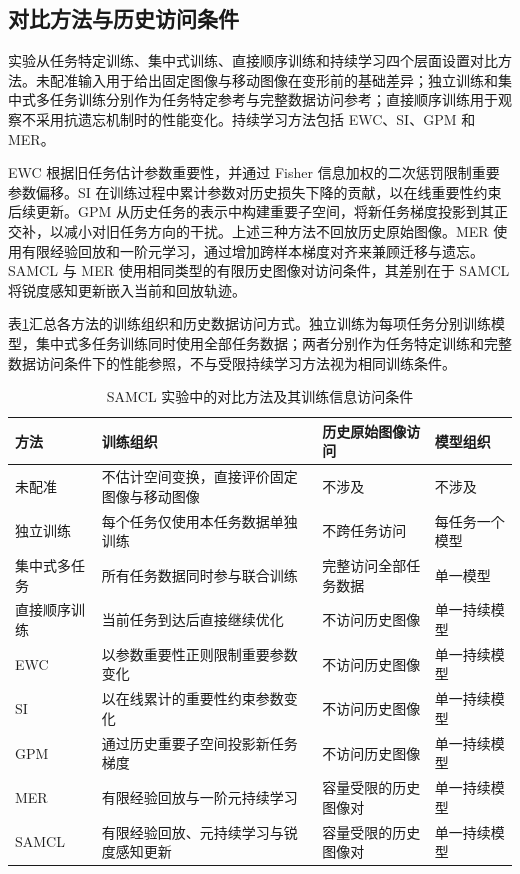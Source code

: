 \subsection{对比方法与历史访问条件}
\label{subsubsec:samcl-baselines}

实验从任务特定训练、集中式训练、直接顺序训练和持续学习四个层面设置对比方法。未配准输入用于给出固定图像与移动图像在变形前的基础差异；独立训练和集中式多任务训练分别作为任务特定参考与完整数据访问参考；直接顺序训练用于观察不采用抗遗忘机制时的性能变化。持续学习方法包括 EWC、SI、GPM 和 MER。

EWC 根据旧任务估计参数重要性，并通过 Fisher 信息加权的二次惩罚限制重要参数偏移\cite{kirkpatrick2017ewc}。SI 在训练过程中累计参数对历史损失下降的贡献，以在线重要性约束后续更新\cite{method_regu_si}。GPM 从历史任务的表示中构建重要子空间，将新任务梯度投影到其正交补，以减小对旧任务方向的干扰\cite{saha2021gpm}。上述三种方法不回放历史原始图像。MER 使用有限经验回放和一阶元学习，通过增加跨样本梯度对齐来兼顾迁移与遗忘\cite{riemer2019mer}。SAMCL 与 MER 使用相同类型的有限历史图像对访问条件，其差别在于 SAMCL 将锐度感知更新嵌入当前和回放轨迹。

表\ref{tab:samcl-baselines}汇总各方法的训练组织和历史数据访问方式。独立训练为每项任务分别训练模型，集中式多任务训练同时使用全部任务数据；两者分别作为任务特定训练和完整数据访问条件下的性能参照，不与受限持续学习方法视为相同训练条件。

\begin{table}[htbp]
\centering
\caption{SAMCL 实验中的对比方法及其训练信息访问条件}
\label{tab:samcl-baselines}
\thesistablefont
\renewcommand{\arraystretch}{1.16}
\setlength{\tabcolsep}{3pt}
\begin{tabular}{p{1.8cm}p{4.6cm}p{3.2cm}p{2.8cm}}
\toprule
方法 & 训练组织 & 历史原始图像访问 & 模型组织 \\
\midrule
未配准 & 不估计空间变换，直接评价固定图像与移动图像 & 不涉及 & 不涉及 \\
独立训练 & 每个任务仅使用本任务数据单独训练 & 不跨任务访问 & 每任务一个模型 \\
集中式多任务 & 所有任务数据同时参与联合训练 & 完整访问全部任务数据 & 单一模型 \\
直接顺序训练 & 当前任务到达后直接继续优化 & 不访问历史图像 & 单一持续模型 \\
EWC & 以参数重要性正则限制重要参数变化 & 不访问历史图像 & 单一持续模型 \\
SI & 以在线累计的重要性约束参数变化 & 不访问历史图像 & 单一持续模型 \\
GPM & 通过历史重要子空间投影新任务梯度 & 不访问历史图像 & 单一持续模型 \\
MER & 有限经验回放与一阶元持续学习 & 容量受限的历史图像对 & 单一持续模型 \\
SAMCL & 有限经验回放、元持续学习与锐度感知更新 & 容量受限的历史图像对 & 单一持续模型 \\
\bottomrule
\end{tabular}
\end{table}

